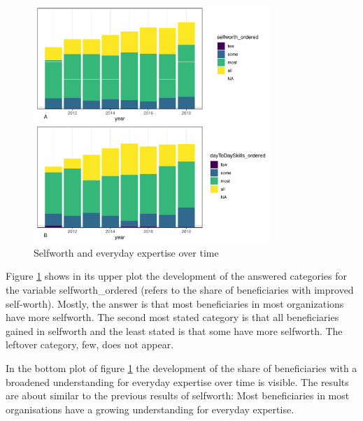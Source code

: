 \documentclass[12pt, a4paper, titlepage]{article}\usepackage[]{graphicx}\usepackage[]{color}
\newenvironment{knitrout}{}{} %
\begin{document}
\begin{figure}
  \caption{Selfworth and everyday expertise over time}
  \label{EqualityTimeplots}
\begin{knitrout}
\color{fgcolor}

{\centering \includegraphics[width=0.8\textwidth]{figure/EqualityTimePlots-1} 

}



\end{knitrout}
\end{figure}

Figure \ref{EqualityTimeplots} shows in its upper plot the development of the answered categories for the variable selfworth\_ordered (refers to the share of beneficiaries with improved self-worth). Mostly, the answer is that most beneficiaries in most organizations have more selfworth. The second most stated category is that all beneficiaries gained in selfworth and the least stated is that some have more selfworth. The leftover category, few, does not appear.

In the bottom plot of figure \ref{EqualityTimeplots} the development of the share of beneficiaries with a broadened understanding for everyday expertise over time is visible. The results are about similar to the previous results of selfworth: Most beneficiaries in most organisations have a growing understanding for everyday expertise. 
\end{document}
